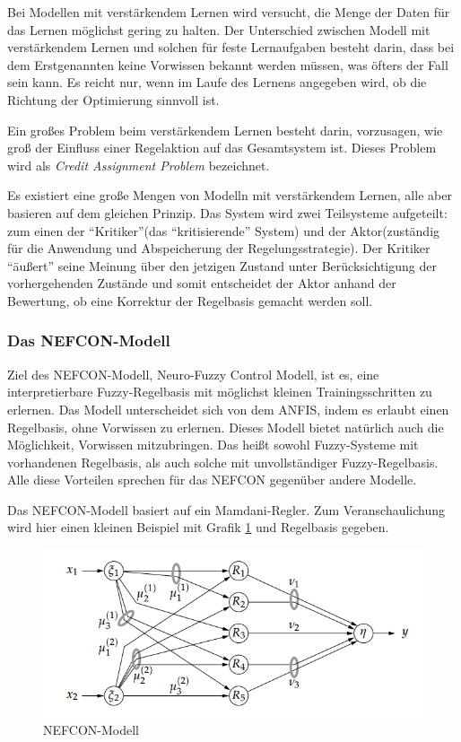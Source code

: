 Bei Modellen mit verstärkendem Lernen wird versucht, die Menge der Daten für das Lernen möglichst gering zu halten. Der Unterschied zwischen Modell mit verstärkendem Lernen und solchen für feste Lernaufgaben besteht darin, dass bei dem Erstgenannten keine Vorwissen bekannt werden müssen, was öfters der Fall sein kann. Es reicht nur, wenn im Laufe des Lernens angegeben wird, ob die Richtung der Optimierung sinnvoll ist.

Ein großes Problem beim verstärkendem Lernen besteht darin, vorzusagen, wie groß der Einfluss einer Regelaktion auf das Gesamtsystem ist. Dieses Problem wird als \textit{Credit Assignment Problem} bezeichnet.

Es existiert eine große Mengen von Modelln mit verstärkendem Lernen, alle aber basieren auf dem gleichen Prinzip. Das System wird zwei Teilsysteme aufgeteilt: zum einen der ``Kritiker''(das ``kritisierende'' System) und der Aktor(zuständig für die Anwendung und Abspeicherung der Regelungsstrategie). Der Kritiker ``äußert'' seine Meinung über den jetzigen Zustand unter Berücksichtigung der vorhergehenden Zustände und somit entscheidet der Aktor anhand der Bewertung, ob eine Korrektur der Regelbasis gemacht werden soll. \cite{CIKruse:15}  \cite{UNIMAG:97}

\subsubsection{Das NEFCON-Modell}

Ziel des NEFCON-Modell, Neuro-Fuzzy Control Modell, ist es, eine interpretierbare Fuzzy-Regelbasis mit möglichst kleinen Trainingsschritten zu erlernen. Das Modell unterscheidet sich von dem ANFIS, indem es erlaubt einen Regelbasis, ohne Vorwissen zu erlernen. Dieses Modell bietet natürlich auch die Möglichkeit, Vorwissen mitzubringen. Das heißt sowohl Fuzzy-Systeme mit vorhandenen Regelbasis, als auch solche mit unvollständiger Fuzzy-Regelbasis. Alle diese Vorteilen sprechen für das NEFCON gegenüber andere Modelle.

Das NEFCON-Modell basiert auf ein Mamdani-Regler. Zum Veranschaulichung wird hier einen kleinen Beispiel mit Grafik \ref{NEFCON_Abb} und Regelbasis gegeben. \cite{CIKruse:15}

\begin{figure}[htbp]
	\centering
	\includegraphics[scale=0.5]{images/nefcon_abb.png}
	\caption{NEFCON-Modell \cite{CIKruse:15}}\label{NEFCON_Abb}
\end{figure}


